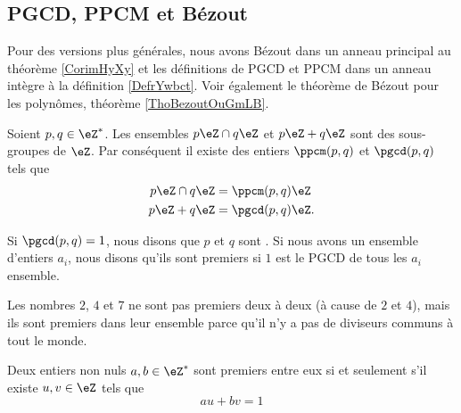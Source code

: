 
\subsection{PGCD, PPCM et Bézout}

Pour des versions plus générales, nous avons Bézout dans un anneau principal au théorème \ref{CorimHyXy} et les définitions de PGCD et PPCM dans un anneau intègre à la définition \ref{DefrYwbct}. Voir également le théorème de Bézout pour les polynômes, théorème \ref{ThoBezoutOuGmLB}.

Soient \( p,q\in\eZ^*\). Les ensembles \( p\eZ\cap q\eZ\) et \( p\eZ+q\eZ\) sont des sous-groupes de \( \eZ\). Par conséquent il existe des entiers \( \ppcm(p,q)\) et \( \pgcd(p,q)\) tels que
\begin{subequations}
    \begin{align}
        p\eZ\cap q\eZ&=\ppcm(p,q)\eZ\\
        p\eZ + q\eZ&=\pgcd(p,q)\eZ.
    \end{align}
\end{subequations}

\begin{definition}  \label{DefZHRXooNeWIcB}
    Si \( \pgcd(p,q)=1\), nous disons que \( p\) et \( q\) sont . Si nous avons un ensemble d'entiers \( a_i\), nous disons qu'ils sont premiers  si \( 1\) est le PGCD de tous les \( a_i\) ensemble.
\end{definition}

Les nombres \( 2\), \( 4\) et \( 7\) ne sont pas premiers deux à deux (à cause de \( 2\) et \( 4\)), mais ils sont premiers dans leur ensemble parce qu'il n'y a pas de diviseurs communs à tout le monde.

\begin{theorem} \label{ThoBuNjam}   
    Deux entiers non nuls \( a,b\in\eZ^*\) sont premiers entre eux si et seulement s'il existe \( u,v\in\eZ\) tels que 
    \begin{equation}
        au+bv=1
    \end{equation}
\end{theorem}


